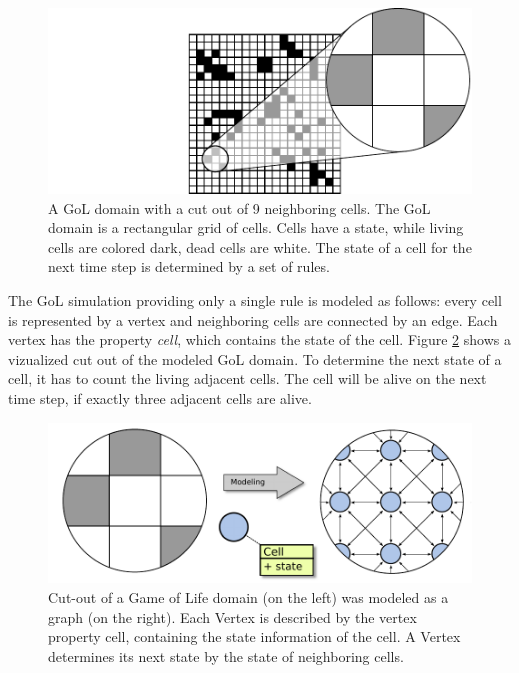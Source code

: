 \begin{figure}[H]
  \centering \includegraphics[width=\textwidth]{graphics/30_gol_simulation}
  \caption{A GoL domain with a cut out of 9 neighboring cells. The GoL
    domain is a rectangular grid of cells.  Cells have a state, while
    living cells are colored dark, dead cells are white. The state of
    a cell for the next time step is determined by a set of rules.}
  \label{fig:gol_simulation}
\end{figure}

\noindent The GoL simulation providing only a single rule is modeled as follows:
every cell is represented by a vertex and neighboring cells are
connected by an edge.  Each vertex has the property \emph{cell}, which
contains the state of the cell. Figure \ref{fig:gol_modeling} shows a
vizualized cut out of the modeled GoL domain. To determine the next
state of a cell, it has to count the living adjacent cells. The cell
will be alive on the next time step, if exactly three adjacent cells
are alive.


\begin{figure}[H]
  \centering \includegraphics[width=\textwidth]{graphics/30_gol_modeling}
  \caption{Cut-out of a Game of Life domain (on the left) was modeled
    as a graph (on the right). Each Vertex is described by the vertex
    property cell, containing the state information of the cell. A
    Vertex determines its next state by the state of neighboring
    cells.}
  \label{fig:gol_modeling}
\end{figure}

